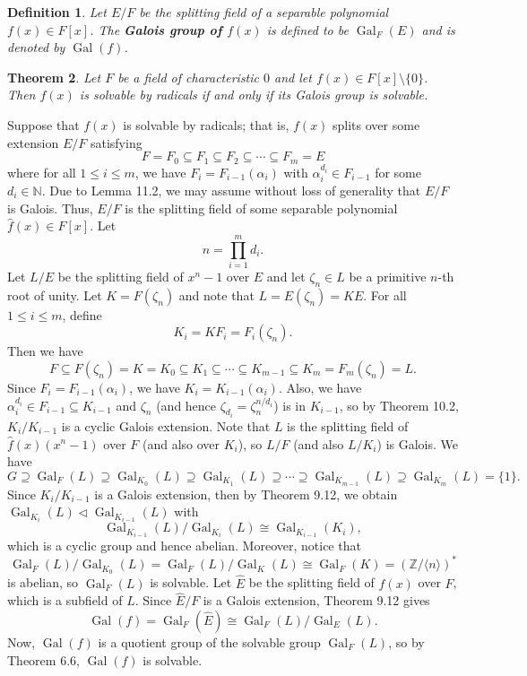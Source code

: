 \documentclass[10pt]{article}
\makeatletter
\newcommand{\N}{\mathbb{N}}
\newcommand{\Z}{\mathbb{Z}}
\newcommand{\norm}{\triangleleft}
\DeclareMathOperator{\Gal}{Gal}
\theoremstyle{newstyle}
\newtheorem{thm}{Theorem}[section]
\newtheorem{defn}[thm]{Definition}
\newenvironment{pf}[1][\proofname]{\par
  \pushQED{\qed}%
  \normalfont \topsep0\p@\relax
  \trivlist
  \item[\hskip\labelsep\scshape
  #1\@addpunct{.}]\ignorespaces
}{%
  \popQED\endtrivlist\@endpefalse
}
\makeatother
\begin{document}
\begin{defn}
Let $E/F$ be the splitting field of a separable polynomial $f(x) \in F[x]$. The {\bf Galois group 
of $f(x)$} is defined to be $\Gal_F(E)$ and is denoted by $\Gal(f)$. 
\end{defn}

\begin{thm}
Let $F$ be a field of characteristic $0$ and let $f(x) \in F[x] \setminus \{0\}$. Then 
$f(x)$ is solvable by radicals if and only if its Galois group is solvable. 
\end{thm}
\begin{pf}
Suppose that $f(x)$ is solvable by radicals; that is, $f(x)$ splits over some extension $E/F$ satisfying
\[ F = F_0 \subseteq F_1 \subseteq F_2 \subseteq \cdots \subseteq F_m = E \]
where for all $1 \leq i \leq m$, we have $F_i = F_{i-1}(\alpha_i)$ with $\alpha_i^{d_i} \in F_{i-1}$ 
for some $d_i \in \N$. Due to Lemma 11.2, we may assume without loss of generality that 
$E/F$ is Galois. Thus, $E/F$ is the splitting field of some separable polynomial $\hat f(x) \in F[x]$. 
Let 
\[ n = \prod_{i=1}^m d_i. \]
Let $L/E$ be the splitting field of $x^n-1$ over $E$ and let $\zeta_n \in L$ be a primitive 
$n$-th root of unity. Let $K = F(\zeta_n)$ and note that $L = E(\zeta_n) = KE$. For all 
$1 \leq i \leq m$, define 
\[ K_i = KF_i = F_i(\zeta_n). \] 
Then we have 
\[ F \subseteq F(\zeta_n) = K = K_0 \subseteq K_1 \subseteq \cdots \subseteq K_{m-1} \subseteq K_m 
= F_m(\zeta_n) = L. \]
Since $F_i = F_{i-1}(\alpha_i)$, we have $K_i = K_{i-1}(\alpha_i)$. Also, we have 
$\alpha_i^{d_i} \in F_{i-1} \subseteq K_{i-1}$ and $\zeta_n$ (and hence $\zeta_{d_i} = \zeta_n^{n/d_i}$)
is in $K_{i-1}$, so by Theorem 10.2, $K_i/K_{i-1}$ is a cyclic Galois extension. Note that $L$ 
is the splitting field of $\hat f(x)(x^n - 1)$ over $F$ (and also over $K_i$), so 
$L/F$ (and also $L/K_i$) is Galois. We have 
\[ G \supseteq \Gal_F(L) \supseteq \Gal_{K_0}(L) \supseteq \Gal_{K_1}(L) \supseteq 
\cdots \supseteq \Gal_{K_{m-1}}(L) \supseteq \Gal_{K_m}(L) = \{1\}. \]
Since $K_i/K_{i-1}$ is a Galois extension, then by Theorem 9.12, we obtain $\Gal_{K_i}(L) 
\norm \Gal_{K_{i-1}}(L)$ with 
\[ \Gal_{K_{i-1}}(L)/\Gal_{K_i}(L) \cong \Gal_{K_{i-1}}(K_i), \]
which is a cyclic group and hence abelian. Moreover, notice that 
\[ \Gal_F(L)/\Gal_{K_0}(L) = \Gal_F(L)/\Gal_K(L) \cong \Gal_F(K) = (\Z/\langle n \rangle)^* \]
is abelian, so $\Gal_F(L)$ is solvable. Let $\hat E$ be the splitting field of $f(x)$ over $F$, which 
is a subfield of $L$. Since $\hat E/F$ is a Galois extension, Theorem 9.12 gives 
\[ \Gal(f) = \Gal_F(\hat E) \cong \Gal_F(L)/\Gal_E(L). \]
Now, $\Gal(f)$ is a quotient group of the solvable group $\Gal_F(L)$, so by Theorem 6.6,
$\Gal(f)$ is solvable. 


\end{pf}
\end{document}
